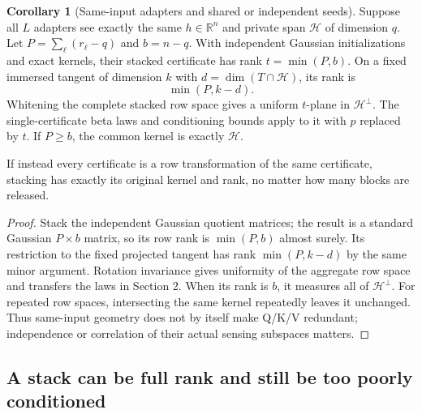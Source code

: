 \documentclass[11pt,a4paper]{article}
\theoremstyle{definition}
\newtheorem{corollary}[theorem]{Corollary}
\theoremstyle{definition}
\theoremstyle{remark}\newtheorem{remark}[theorem]{Remark}
\newcommand{\R}{\mathbb R}\newcommand{\Prob}{\mathbb P}\newcommand{\E}{\mathbb E}
\newcommand{\HH}{\mathcal H}\newcommand{\XX}{\mathcal X}\newcommand{\col}{\operatorname{col}}
\begin{document}
\begin{corollary}[Same-input adapters and shared or independent seeds]\label{cor:sameinput}
Suppose all $L$ adapters see exactly the same $h\in\R^n$ and private span $\HH$ of dimension $q$. Let $P=\sum_\ell(r_\ell-q)$ and $b=n-q$. With independent Gaussian initializations and exact kernels, their stacked certificate has rank $t=\min(P,b)$. On a fixed immersed tangent of dimension $k$ with $d=\dim(T\cap\HH)$, its rank is
\[
\min(P,k-d).
\]
Whitening the complete stacked row space gives a uniform $t$-plane in $\HH^\perp$. The single-certificate beta laws and conditioning bounds apply to it with $p$ replaced by $t$. If $P\ge b$, the common kernel is exactly $\HH$.

If instead every certificate is a row transformation of the same certificate, stacking has exactly its original kernel and rank, no matter how many blocks are released.
\end{corollary}
\begin{proof}
Stack the independent Gaussian quotient matrices; the result is a standard Gaussian $P\times b$ matrix, so its row rank is $\min(P,b)$ almost surely. Its restriction to the fixed projected tangent has rank $\min(P,k-d)$ by the same minor argument. Rotation invariance gives uniformity of the aggregate row space and transfers the laws in Section 2. When its rank is $b$, it measures all of $\HH^\perp$. For repeated row spaces, intersecting the same kernel repeatedly leaves it unchanged. Thus same-input geometry does not by itself make Q/K/V redundant; independence or correlation of their actual sensing subspaces matters.
\end{proof}

\subsection{A stack can be full rank and still be too poorly conditioned}
\end{document}
